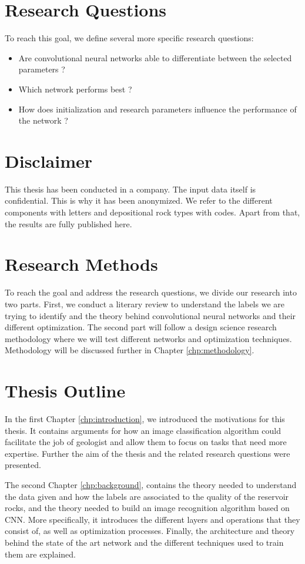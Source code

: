 \section{Research Questions}
To reach this goal, we define several more specific research questions: 
\begin{itemize}
    \item Are convolutional neural networks able to differentiate between the selected parameters ?
    \item Which network performs best ?
    \item How does initialization and research parameters influence the performance of the network ?
\end{itemize}

\section{Disclaimer}
This thesis has been conducted in a company. The input data itself is confidential. This is why it has been anonymized. We refer to the different components with letters and depositional rock types with codes. Apart from that, the results are fully published here.  

\section{Research Methods}\label{sec:research-method}
To reach the goal and address the research questions, we divide our research into two parts. First, we conduct a literary review to understand the labels we are trying to identify and the theory behind convolutional neural networks and their different optimization. The second part will follow a design science research methodology where we will test different networks and optimization techniques. Methodology will be discussed further in Chapter \ref{chp:methodology}.
\section{Thesis Outline}

In the first Chapter \ref{chp:introduction}, we introduced the motivations for this thesis. It contains arguments for how an image classification algorithm could facilitate the job of geologist and allow them to focus on tasks that need more expertise. Further the aim of the thesis and the related research questions were presented. 


The second Chapter \ref{chp:background}, contains the theory needed to understand the data given and how the labels are associated to the quality of the reservoir rocks, and the theory needed to build an image recognition algorithm based on CNN. More specifically, it introduces the different layers and operations that they consist of, as well as optimization processes. Finally, the architecture and theory behind the state of the art network and the different techniques used to train them are explained.
 

